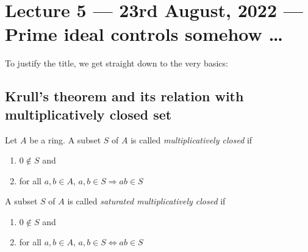 \section{Lecture 5 --- 23rd August, 2022 --- Prime ideal controls somehow \ldots}

To justify the title, we get straight down to the very basics:


\subsection{Krull's theorem and its relation with multiplicatively closed set}
\begin{definition}
    Let $A$ be a ring. A subset $S$ of $A$ is called \textit{multiplicatively closed} if
    \begin{enumerate}[label=(\roman*)]
	\item $0\not \in S$ and
	\item for all $a,b\in A$, $a,b \in S \Longrightarrow ab\in S$
    \end{enumerate}
    A subset $S$ of $A$ is called \textit{saturated multiplicatively closed} if 
\begin{enumerate}[label=(\roman*)]
	\item $0\not \in S$ and
	\item for all $a,b\in A$, $a,b \in S \Longleftrightarrow ab\in S$
    \end{enumerate}

    \label{def:MCS}
\end{definition}

